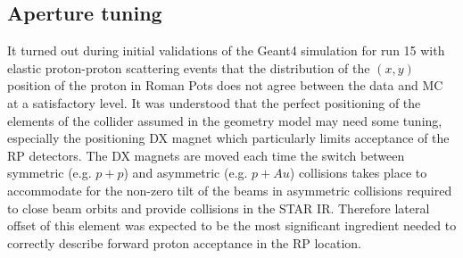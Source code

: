 \subsection{Aperture tuning}

It turned out during initial validations of the Geant4 simulation for run 15 with elastic proton-proton scattering events that the distribution of the $(x,y)$ position of the proton in Roman Pots does not agree between the data and MC at a satisfactory level. It was understood that the perfect positioning of the elements of the collider assumed in the geometry model may need some tuning, especially the positioning DX magnet which particularly limits acceptance of the RP detectors. The DX magnets are moved each time the switch between symmetric (e.g. $p+p$) and asymmetric (e.g. $p+Au$) collisions takes place to accommodate for the non-zero tilt of the beams in asymmetric collisions required to close beam orbits and provide collisions in the STAR IR. Therefore lateral offset of this element was expected to be the most significant ingredient needed to correctly describe forward proton acceptance in the RP location.

